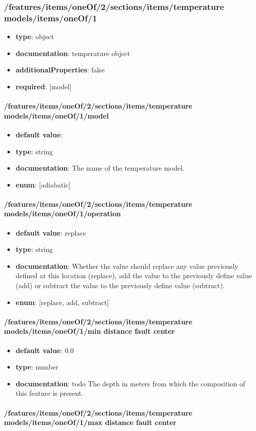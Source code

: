 \subsubsection{/features/items/oneOf/2/sections/items/temperature models/items/oneOf/1}
\begin{itemize}\item {\bf type}: object
\item {\bf documentation}: temperature object
\item {\bf additionalProperties}: false
\item {\bf required}: [model]\end{itemize}
\paragraph{/features/items/oneOf/2/sections/items/temperature models/items/oneOf/1/model}
\begin{itemize}\item {\bf default value}: 
\item {\bf type}: string
\item {\bf documentation}: The name of the temperature model.
\item {\bf enum}: [adiabatic]\end{itemize}\paragraph{/features/items/oneOf/2/sections/items/temperature models/items/oneOf/1/operation}
\begin{itemize}\item {\bf default value}: replace
\item {\bf type}: string
\item {\bf documentation}: Whether the value should replace any value previously defined at this location (replace), add the value to the previously define value (add) or subtract the value to the previously define value (subtract).
\item {\bf enum}: [replace, add, subtract]\end{itemize}\paragraph{/features/items/oneOf/2/sections/items/temperature models/items/oneOf/1/min distance fault center}
\begin{itemize}\item {\bf default value}: 0.0
\item {\bf type}: number
\item {\bf documentation}: todo The depth in meters from which the composition of this feature is present.
\end{itemize}\paragraph{/features/items/oneOf/2/sections/items/temperature models/items/oneOf/1/max distance fault center}
